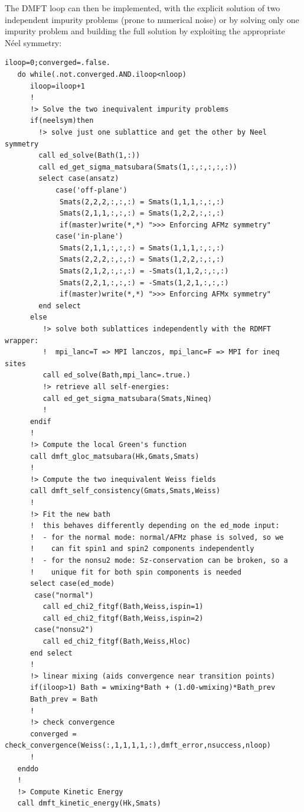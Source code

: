 \documentclass[edipack_sp.tex]{subfiles}
\begin{document}
The DMFT loop can then be implemented, with the explicit solution of two
independent impurity problems (prone to numerical noise) or by solving
only one impurity problem and building the full solution by exploiting 
the appropriate Néel symmetry:

\begin{lstlisting}[style=fstyle,numbers=none,basicstyle={\scriptsize\ttfamily}]
   iloop=0;converged=.false.
   do while(.not.converged.AND.iloop<nloop)
      iloop=iloop+1
      !
      !> Solve the two inequivalent impurity problems
      if(neelsym)then
        !> solve just one sublattice and get the other by Neel symmetry
        call ed_solve(Bath(1,:))
        call ed_get_sigma_matsubara(Smats(1,:,:,:,:,:))
        select case(ansatz)
            case('off-plane')
             Smats(2,2,2,:,:,:) = Smats(1,1,1,:,:,:) 
             Smats(2,1,1,:,:,:) = Smats(1,2,2,:,:,:) 
             if(master)write(*,*) ">>> Enforcing AFMz symmetry"
            case('in-plane')
             Smats(2,1,1,:,:,:) = Smats(1,1,1,:,:,:)   
             Smats(2,2,2,:,:,:) = Smats(1,2,2,:,:,:)   
             Smats(2,1,2,:,:,:) = -Smats(1,1,2,:,:,:)  
             Smats(2,2,1,:,:,:) = -Smats(1,2,1,:,:,:) 
             if(master)write(*,*) ">>> Enforcing AFMx symmetry"
        end select
      else
         !> solve both sublattices independently with the RDMFT wrapper:
         !  mpi_lanc=T => MPI lanczos, mpi_lanc=F => MPI for ineq sites
         call ed_solve(Bath,mpi_lanc=.true.)
         !> retrieve all self-energies:
         call ed_get_sigma_matsubara(Smats,Nineq)
         !
      endif
      !
      !> Compute the local Green's function
      call dmft_gloc_matsubara(Hk,Gmats,Smats)
      !
      !> Compute the two inequivalent Weiss fields
      call dmft_self_consistency(Gmats,Smats,Weiss)
      !
      !> Fit the new bath
      !  this behaves differently depending on the ed_mode input:
      !  - for the normal mode: normal/AFMz phase is solved, so we 
      !    can fit spin1 and spin2 components independently
      !  - for the nonsu2 mode: Sz-conservation can be broken, so a 
      !    unique fit for both spin components is needed
      select case(ed_mode)
       case("normal")
         call ed_chi2_fitgf(Bath,Weiss,ispin=1)
         call ed_chi2_fitgf(Bath,Weiss,ispin=2)
       case("nonsu2")
         call ed_chi2_fitgf(Bath,Weiss,Hloc)
      end select
      !
      !> linear mixing (aids convergence near transition points)
      if(iloop>1) Bath = wmixing*Bath + (1.d0-wmixing)*Bath_prev
      Bath_prev = Bath
      !
      !> check convergence
      converged = check_convergence(Weiss(:,1,1,1,1,:),dmft_error,nsuccess,nloop)
      !
   enddo
   !
   !> Compute Kinetic Energy
   call dmft_kinetic_energy(Hk,Smats)
\end{lstlisting}
\end{document}
